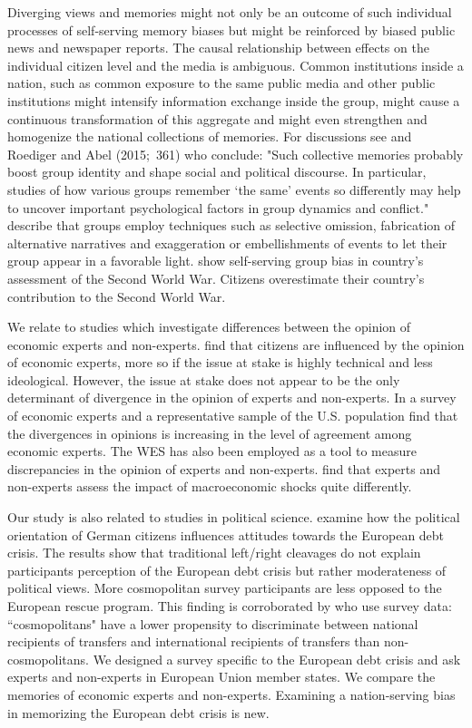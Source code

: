 Diverging views and memories might not only be an outcome of
such individual processes of self-serving memory biases but might be reinforced 
by biased public news and newspaper reports. The causal relationship between effects on the individual citizen level and
the media is ambiguous. Common
institutions inside a nation, such as common exposure to the same public
media and other public institutions might intensify information exchange
inside the group, might cause a continuous transformation of this aggregate
and might even strengthen and homogenize the national collections of
memories. For discussions see \cite{rigney} and Roediger and Abel (2015;\
361) who conclude: "Such collective memories probably boost group identity
and shape social and political discourse. In particular, studies of how
various groups remember `the same' events so differently may help to uncover
important psychological factors in group dynamics and conflict." \cite{baumeister} describe that groups employ techniques such as selective omission, fabrication of alternative narratives and exaggeration or embellishments of events to let their group appear in a favorable light. \cite{abel} show self-serving group bias in country's assessment of the Second World War. Citizens overestimate their country's contribution to the Second World War. 

We relate to studies which investigate differences between the opinion of economic experts and non-experts. \cite{johnston} find that citizens are influenced by the opinion of economic experts, more so if the issue at stake is highly technical and less ideological. However, the issue at stake does not appear to be the only determinant of divergence in the opinion of experts and non-experts. In a survey of economic experts and a representative sample of the U.S. population \cite{sapienza} find that the divergences in opinions is increasing in the level of agreement among economic experts. The WES has also been employed as a tool to measure discrepancies in the opinion of experts and non-experts. \cite{roth} find that experts and non-experts assess the impact of macroeconomic shocks quite differently.

Our study is also related to studies in political science.
\cite{bechtel} examine how the political orientation of German citizens influences attitudes towards the European debt crisis. The results show that traditional left/right cleavages do not explain participants perception of the European debt crisis but rather moderateness of political views. More cosmopolitan survey participants are less opposed to the European rescue program. This finding is corroborated by \cite{kuhn} who use survey data: ``cosmopolitans" have a lower propensity to discriminate between national recipients of transfers and international recipients of transfers than non-cosmopolitans. We designed a survey specific to the European debt crisis and ask experts and non-experts in European Union member states. We compare the memories of economic experts and non-experts. Examining a nation-serving bias in memorizing the European debt crisis is new. 


